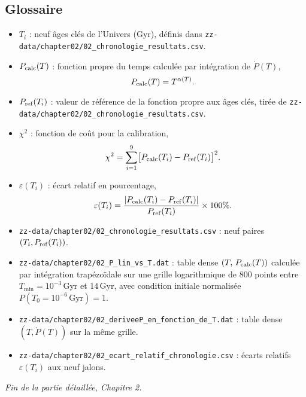 \subsection{Glossaire}
\begin{itemize}
  \item $T_i$ : neuf âges clés de l’Univers (Gyr), définis dans \texttt{zz-data/chapter02/02\_chronologie\_resultats.csv}.
  \item $P_{\rm calc}(T)$ : fonction propre du temps calculée par intégration de $\dot P(T)$, 
    \[
      P_{\rm calc}(T)=T^{\alpha(T)}.
    \]
  \item $P_{\rm ref}(T_i)$ : valeur de référence de la fonction propre aux âges clés, tirée de \texttt{zz-data/chapter02/02\_chronologie\_resultats.csv}.
  \item $\chi^2$ : fonction de coût pour la calibration, 
    \[
      \chi^2 = \sum_{i=1}^{9}\bigl[P_{\rm calc}(T_i)-P_{\rm ref}(T_i)\bigr]^{2}.
    \]
  \item $\varepsilon(T_i)$ : écart relatif en pourcentage, 
    \[
      \varepsilon(T_i)
      = \frac{\lvert P_{\rm calc}(T_i)-P_{\rm ref}(T_i)\rvert}
             {P_{\rm ref}(T_i)}\times100\%.
    \]
  \item \texttt{zz-data/chapter02/02\_chronologie\_resultats.csv} : neuf paires $(T_i,P_{\rm ref}(T_i))$.
  \item \texttt{zz-data/chapter02/02\_P\_lin\_vs\_T.dat} : table dense \((T,\,P_{\rm calc}(T))\) calculée par intégration trapézoïdale sur une grille logarithmique de 800 points entre \(T_{\min}=10^{-3}\)\,Gyr et \(14\)\,Gyr, avec condition initiale normalisée \(P(T_{0}=10^{-6}\,\mathrm{Gyr})=1\).
  \item \texttt{zz-data/chapter02/02\_deriveeP\_en\_fonction\_de_T.dat} : table dense $(T,\dot P(T))$ sur la même grille.
  \item \texttt{zz-data/chapter02/02\_ecart\_relatif\_chronologie.csv} : écarts relatifs $\varepsilon(T_i)$ aux neuf jalons.
\end{itemize}

\bigskip
\noindent\emph{Fin de la partie détaillée, Chapitre 2.}